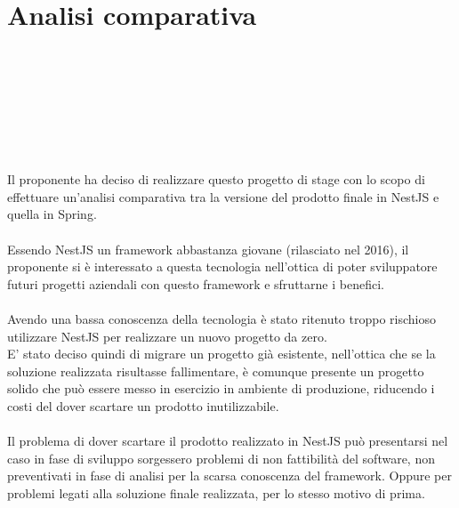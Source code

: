 
\chapter{Analisi comparativa}
\label{cap:analisi-comparativa}

\\\\\\\\\\\\\\
Il proponente ha deciso di realizzare questo progetto di stage con lo scopo di effettuare 
un'analisi comparativa tra la versione del prodotto finale in NestJS e quella in Spring.
\\\\
Essendo NestJS un framework abbastanza giovane (rilasciato nel 2016), il proponente si 
è interessato a questa tecnologia nell'ottica di poter sviluppatore futuri progetti 
aziendali con questo framework e sfruttarne i benefici.
\\\\
Avendo una bassa conoscenza della tecnologia è stato ritenuto troppo rischioso utilizzare NestJS per 
realizzare un nuovo progetto da zero. 
\\
E' stato deciso quindi di migrare un progetto già esistente, nell'ottica che se la soluzione
realizzata risultasse fallimentare, è comunque presente un progetto solido che può essere
messo in esercizio in ambiente di produzione, riducendo i costi del dover scartare un prodotto 
inutilizzabile.
\\\\
Il problema di dover scartare il prodotto realizzato in NestJS può presentarsi nel caso in fase di sviluppo
sorgessero problemi di non fattibilità del software, non preventivati in fase di analisi per la
scarsa conoscenza del framework. Oppure per problemi legati alla soluzione finale realizzata, per lo 
stesso motivo di prima.

